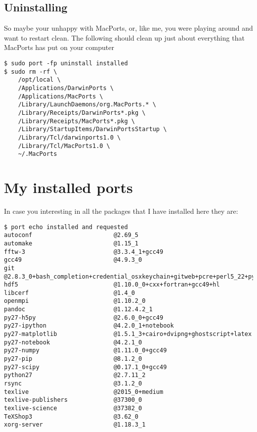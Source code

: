 \documentclass[11pt]{article}
\begin{document}
\subsection{Uninstalling}
So maybe your unhappy with MacPorts, or, like me, you were playing around and want to restart clean. The following should clean up just about everything that MacPorts has put on your computer
\begin{lstlisting}[style=Bash]
$ sudo port -fp uninstall installed
$ sudo rm -rf \
    /opt/local \
    /Applications/DarwinPorts \
    /Applications/MacPorts \
    /Library/LaunchDaemons/org.MacPorts.* \
    /Library/Receipts/DarwinPorts*.pkg \
    /Library/Receipts/MacPorts*.pkg \
    /Library/StartupItems/DarwinPortsStartup \
    /Library/Tcl/darwinports1.0 \
    /Library/Tcl/MacPorts1.0 \
    ~/.MacPorts
\end{lstlisting}



%
%
\appendix

\section{My installed ports}

In case you interesting in all the packages that I have installed here they are:
\begin{lstlisting}[style=Bash]
$ port echo installed and requested
autoconf                       @2.69_5 
automake                       @1.15_1 
fftw-3                         @3.3.4_1+gcc49 
gcc49                          @4.9.3_0 
git                            @2.8.3_0+bash_completion+credential_osxkeychain+gitweb+pcre+perl5_22+python27+svn 
hdf5                           @1.10.0_0+cxx+fortran+gcc49+hl 
libcerf                        @1.4_0 
openmpi                        @1.10.2_0 
pandoc                         @1.12.4.2_1 
py27-h5py                      @2.6.0_0+gcc49 
py27-ipython                   @4.2.0_1+notebook 
py27-matplotlib                @1.5.1_3+cairo+dvipng+ghostscript+latex 
py27-notebook                  @4.2.1_0 
py27-numpy                     @1.11.0_0+gcc49 
py27-pip                       @8.1.2_0 
py27-scipy                     @0.17.1_0+gcc49 
python27                       @2.7.11_2 
rsync                          @3.1.2_0 
texlive                        @2015_0+medium 
texlive-publishers             @37300_0 
texlive-science                @37382_0 
TeXShop3                       @3.62_0 
xorg-server                    @1.18.3_1 
\end{lstlisting}
\end{document}
